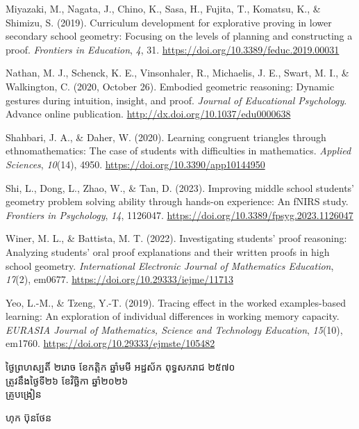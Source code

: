 \documentclass[a4paper,12pt]{article}
\begin{document}
{Miyazaki, M., Nagata, J., Chino, K., Sasa, H., Fujita, T., Komatsu, K., \& Shimizu, S. (2019). Curriculum development for explorative proving in lower secondary school geometry: Focusing on the levels of planning and constructing a proof. \textit{Frontiers in Education}, \textit{4}, 31. \url{https://doi.org/10.3389/feduc.2019.00031}

Nathan, M. J., Schenck, K. E., Vinsonhaler, R., Michaelis, J. E., Swart, M. I., \& Walkington, C. (2020, October 26). Embodied geometric reasoning: Dynamic gestures during intuition, insight, and proof. \textit{Journal of Educational Psychology}. Advance online publication. \url{http://dx.doi.org/10.1037/edu0000638}

Shahbari, J. A., \& Daher, W. (2020). Learning congruent triangles through ethnomathematics: The case of students with difficulties in mathematics. \textit{Applied Sciences}, \textit{10}(14), 4950. \url{https://doi.org/10.3390/app10144950}

Shi, L., Dong, L., Zhao, W., \& Tan, D. (2023). Improving middle school students' geometry problem solving ability through hands-on experience: An fNIRS study. \textit{Frontiers in Psychology}, \textit{14}, 1126047. \url{https://doi.org/10.3389/fpsyg.2023.1126047}

Winer, M. L., \& Battista, M. T. (2022). Investigating students' proof reasoning: Analyzing students' oral proof explanations and their written proofs in high school geometry. \textit{International Electronic Journal of Mathematics Education}, \textit{17}(2), em0677. \url{https://doi.org/10.29333/iejme/11713}

Yeo, L.-M., \& Tzeng, Y.-T. (2019). Tracing effect in the worked examples-based learning: An exploration of individual differences in working memory capacity. \textit{EURASIA Journal of Mathematics, Science and Technology Education}, \textit{15}(10), em1760. \url{https://doi.org/10.29333/ejmste/105482}

\par}

\needspace{2.0cm}
\vspace{10pt}
\hfill
\begin{minipage}{10.2cm}
  {\centering
    ថ្ងៃព្រហស្បតិ៍ ២រោច ខែកត្តិក ឆ្នាំមមី អដ្ឋស័ក ពុទ្ធសករាជ ២៥៧០\\[2pt]
    ត្រូវនឹងថ្ងៃទី២៦ ខែវិច្ឆិកា ឆ្នាំ២០២៦\\[4pt]
    {\muol\fontsize{11.5pt}{18pt}\selectfont គ្រូបង្រៀន}\par}
  \vspace{32pt}
  \hfill{\muol\fontsize{11.5pt}{18pt}\selectfont ហុក ប៊ុនថែន}\hspace*{1.4cm}
\end{minipage}
\end{document}
